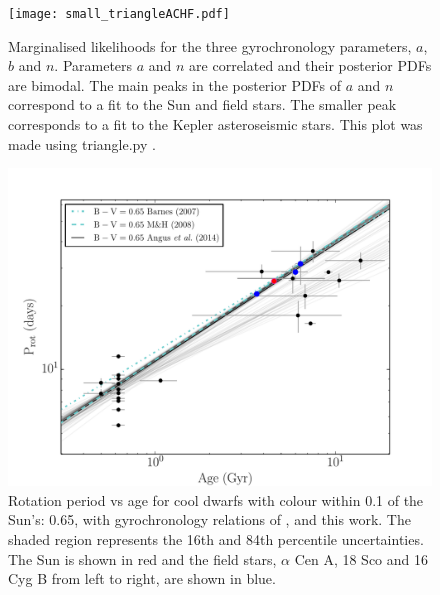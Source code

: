 \documentclass[useAMS, usenatbib]{mn2e}
\begin{document}
\begin{figure}
\begin{center}
\texttt{[image: small\_triangleACHF.pdf]}
\caption{Marginalised likelihoods for the three gyrochronology
parameters, $a$, $b$ and $n$. Parameters $a$ and $n$ are correlated and their
posterior PDFs are bimodal. The main peaks in the posterior PDFs of $a$ and
$n$ correspond to a fit to the Sun and field stars. The smaller peak
corresponds to a fit to the Kepler asteroseismic stars.
This plot was made using triangle.py
\citep{Foreman-Mackey_triangle}.
\label{fig:triangle}}
\end{center}
\end{figure}

\begin{figure}
\begin{center}
\includegraphics[width=6in, clip=true, trim=0 0 0.5in 0]{p_vs_a_solar.pdf}
\caption{Rotation period vs age for cool dwarfs with colour within 0.1 of the
	Sun's: 0.65, with gyrochronology relations of \citet{Barnes2007},
	\citet{Mamajek2008} and this work. The shaded region represents the
	16th and 84th percentile uncertainties. The Sun is shown in red and the
	field stars, $\alpha$ Cen A, 18 Sco and 16 Cyg B from left to right,
	are shown in blue.
\label{fig:p_vs_a_solar}}
\end{center}
\end{figure}
\end{document}

